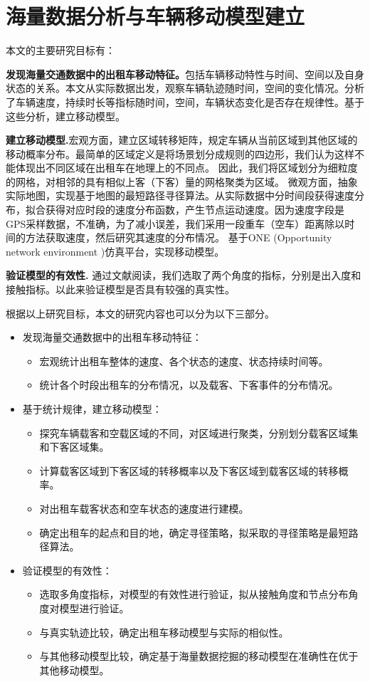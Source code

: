 \chapter{海量数据分析与车辆移动模型建立}

本文的主要研究目标有：

   \textbf{发现海量交通数据中的出租车移动特征。}包括车辆移动特性与时间、空间以及自身状态的关系。本文从实际数据出发，观察车辆轨迹随时间，空间的变化情况。分析了车辆速度，持续时长等指标随时间，空间，车辆状态变化是否存在规律性。基于这些分析，建立移动模型。
   
   \textbf{建立移动模型.}宏观方面，建立区域转移矩阵，规定车辆从当前区域到其他区域的移动概率分布。最简单的区域定义是将场景划分成规则的四边形，我们认为这样不能体现出不同区域在出租车在地理上的不同点。
因此，我们将区域划分为细粒度的网格，对相邻的具有相似上客（下客）量的网格聚类为区域。
微观方面，抽象实际地图，实现基于地图的最短路径寻径算法。从实际数据中分时间段获得速度分布，拟合获得对应时段的速度分布函数，产生节点运动速度。因为速度字段是GPS采样数据，不准确，为了减小误差，我们采用一段重车（空车）距离除以时间的方法获取速度，然后研究其速度的分布情况。
基于ONE (Opportunity network environment )仿真平台，实现移动模型。

  \textbf{验证模型的有效性.}
通过文献阅读，我们选取了两个角度的指标，分别是出入度和接触指标。以此来验证模型是否具有较强的真实性。


根据以上研究目标，本文的研究内容也可以分为以下三部分。
\begin{itemize}
  \item 发现海量交通数据中的出租车移动特征：
  \begin{itemize}
  \item 宏观统计出租车整体的速度、各个状态的速度、状态持续时间等。
  \item 统计各个时段出租车的分布情况，以及载客、下客事件的分布情况。
  \end{itemize}
 \item 基于统计规律，建立移动模型：
 \begin{itemize}
 \item 探究车辆载客和空载区域的不同，对区域进行聚类，分别划分载客区域集和下客区域集。
 \item 计算载客区域到下客区域的转移概率以及下客区域到载客区域的转移概率。
 \item 对出租车载客状态和空车状态的速度进行建模。
 \item 确定出租车的起点和目的地，确定寻径策略，拟采取的寻径策略是最短路径算法。
 \end{itemize}
 \item 验证模型的有效性：
  \begin{itemize}
  \item 选取多角度指标，对模型的有效性进行验证，拟从接触角度和节点分布角度对模型进行验证。
  \item 与真实轨迹比较，确定出租车移动模型与实际的相似性。
  \item 与其他移动模型比较，确定基于海量数据挖掘的移动模型在准确性在优于其他移动模型。
 \end{itemize}
\end{itemize}

